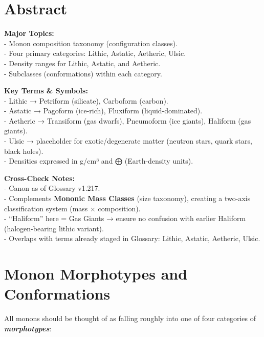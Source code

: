 \documentclass[
  letterpaper,
]{book}
\begin{document}
\section{Abstract}\label{abstract-37}

\textbf{Major Topics:}\\
- Monon composition taxonomy (configuration classes).\\
- Four primary categories: Lithic, Astatic, Aetheric, Ulsic.\\
- Density ranges for Lithic, Astatic, and Aetheric.\\
- Subclasses (conformations) within each category.

\textbf{Key Terms \& Symbols:}\\
- Lithic → Petriform (silicate), Carboform (carbon).\\
- Astatic → Pagoform (ice-rich), Fluxiform (liquid-dominated).\\
- Aetheric → Transiform (gas dwarfs), Pneumoform (ice giants), Haliform
(gas giants).\\
- Ulsic → placeholder for exotic/degenerate matter (neutron stars, quark
stars, black holes).\\
- Densities expressed in g/cm³ and ⨁ (Earth-density units).

\textbf{Cross-Check Notes:}\\
- Canon as of Glossary v1.217.\\
- Complements \textbf{Mononic Mass Classes} (size taxonomy), creating a
two-axis classification system (mass × composition).\\
- ``Haliform'' here = Gas Giants → ensure no confusion with earlier
Haliform (halogen-bearing lithic variant).\\
- Overlaps with terms already staged in Glossary: Lithic, Astatic,
Aetheric, Ulsic.

\section{Monon Morphotypes and
Conformations}\label{monon-morphotypes-and-conformations}

All monons should be thought of as falling roughly into one of four
categories of \textbf{\emph{morphotypes}}:
\end{document}

